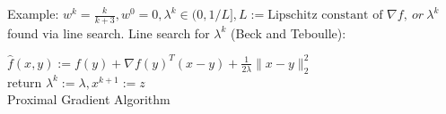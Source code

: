 \documentclass[8pt,letter]{article}
\begin{document}
\begin{multicols*}{2}
  Example: $w^k = \frac{k}{k+3}, w^0 = 0, \lambda^k \in (0,1/L], L:= \text{Lipschitz constant of }\nabla f,\ or\ \lambda^k$ found via line search.
  Line search for $\lambda^k$ (Beck and Teboulle):

  \begin{algorithm}[H]
    $\hat{f}(x,y):=f(y) + \nabla f(y)^T(x-y) + \frac{1}{2\lambda}\|x-y\|^2_2$\\
    return $\lambda^k := \lambda, x^{k+1} := z$\\
    \caption{Proximal Gradient Algorithm\label{Algo_ProximalGradient}}
  \end{algorithm}


\end{multicols*}
\end{document}
